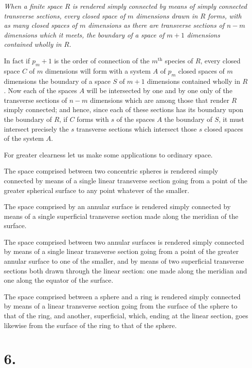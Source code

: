 \documentclass{article}
\begin{document}
\emph{When a finite space $R$ is rendered simply connected by means of simply connected transverse sections, every closed space of $m$ dimensions drawn in $R$ forms, with as many closed spaces of $m$ dimensions as there are transverse sections of $n-m$ dimensions which it meets, the boundary of a space of $m+1$ dimensions contained wholly in $R$.}

In fact if $p_{m}+1$ is the order of connection of the $m^{\text{th}}$ species of $R$, every closed space $C$ of $m$ dimensions will form with a system $A$ of $p_{m}$ closed spaces of $m$ dimensions the boundary of a space $S$ of $m+1$ dimensions contained wholly in $R$. Now each of the spaces $A$ will be intersected by one and by one only of the transverse sections of $n-m$ dimensions which are among those that render $R$ simply connected; and hence, since each of these sections has its boundary upon the boundary of $R$, if $C$ forms with $s$ of the spaces $A$ the boundary of $S$, it must intersect precisely the $s$ transverse sections which intersect those $s$ closed spaces of the system $A$.

For greater clearness let us make some applications to ordinary space.

The space comprised between two concentric spheres is rendered simply connected by means of a single linear transverse section going from a point of the greater spherical surface to any point whatever of the smaller.

The space comprised by an annular surface is rendered simply connected by means of a single superficial transverse section made along the meridian of the surface.


The space comprised between two annular surfaces is rendered simply connected by means of a single linear transverse section going from a point of the greater annular surface to one of the smaller, and by means of two superficial transverse sections both drawn through the linear section: one made along the meridian and one along the equator of the surface.

The space comprised between a sphere and a ring is rendered simply connected by means of a linear transverse section going from the surface of the sphere to that of the ring, and another, superficial, which, ending at the linear section, goes likewise from the surface of the ring to that of the sphere.

\section*{6.}
\end{document}
